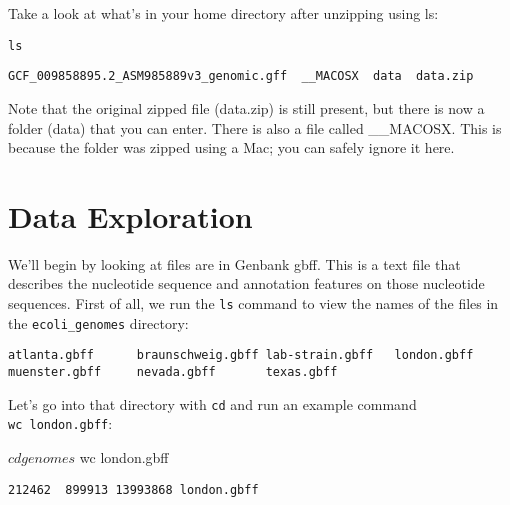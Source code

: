 \documentclass[
]{book}
\newenvironment{Shaded}{\begin{snugshade}}{\end{snugshade}}
\newcommand{\ExtensionTok}[1]{#1}
\newcommand{\NormalTok}[1]{#1}
\begin{document}
Take a look at what's in your home directory after unzipping using ls:

\begin{verbatim}
ls 
\end{verbatim}

\begin{verbatim}
GCF_009858895.2_ASM985889v3_genomic.gff  __MACOSX  data  data.zip
\end{verbatim}

Note that the original zipped file (data.zip) is still present, but there is now a folder (data) that you can enter. There is also a file called \_\_MACOSX. This is because the folder was zipped using a Mac; you can safely ignore it here.

\section{Data Exploration}\label{data-exploration}

We'll begin by looking at files are in Genbank gbff. This is a text file that describes the nucleotide sequence and annotation features on those nucleotide sequences. First of all, we run the \texttt{ls} command to view the names of the files in the \texttt{ecoli\_genomes} directory:

\begin{Shaded}
\end{Shaded}

\begin{verbatim}
atlanta.gbff      braunschweig.gbff lab-strain.gbff   london.gbff       muenster.gbff     nevada.gbff       texas.gbff
\end{verbatim}

Let's go into that directory with \texttt{cd} and run an example command \texttt{wc\ london.gbff}:

\begin{Shaded}
\begin{Highlighting}[]
\ExtensionTok{$}\NormalTok{ cd genomes}
\ExtensionTok{$}\NormalTok{ wc london.gbff}
\end{Highlighting}
\end{Shaded}

\begin{verbatim}
212462  899913 13993868 london.gbff
\end{verbatim}
\end{document}
